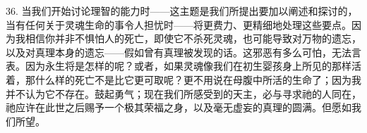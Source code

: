 36. 当我们开始讨论理智的能力时——这主题是我们所提出要加以阐述和探讨的，当有任何关于灵魂生命的事令人担忧时——将更费力、更精细地处理这些要点。因为我相信你并非不惧怕人的死亡，即使它不杀死灵魂，也可能导致对万物的遗忘，以及对真理本身的遗忘——假如曾有真理被发现的话。这邪恶有多么可怕，无法言表。因为永生将是怎样的呢？或者，如果灵魂像我们在初生婴孩身上所见的那样活着，那什么样的死亡不是比它更可取呢？更不用说在母腹中所活的生命了；因为我并不认为它不存在。鼓起勇气；现在我们所感受到的天主，必与寻求祂的人同在，祂应许在此世之后赐予一个极其荣福之身，以及毫无虚妄的真理的圆满。但愿如我们所望。\par

